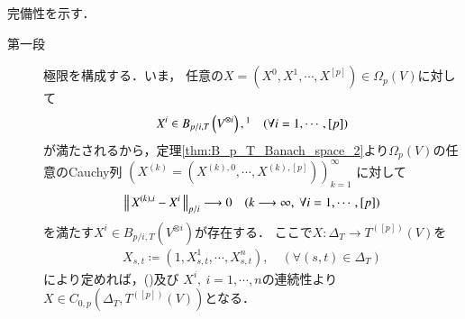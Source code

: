 	\begin{prf}完備性を示す．
		\begin{description}
			\item[第一段] 極限を構成する．いま，
			任意の$X = (X^0,X^1,\cdots,X^{[p]}) \in \Omega_p(V)$に対して
			\begin{align}
				X^i \in B_{p/i,T}\left( V^{\otimes i} \right),\footnotemark
				\quad (\forall i=1,\cdots,[p]) 
			\end{align}
			が満たされるから，定理\ref{thm:B_p_T_Banach_space_2}より$\Omega_p(V)$の任意のCauchy列
			$\left( X^{(k)} = (X^{(k),0},\cdots,X^{(k),[p]}) \right)_{k=1}^{\infty}$
			に対して
			\begin{align}
				\left\|\, X^{(k),i} - X^i\, \right\|_{p/i} \longrightarrow 0
				\quad (k \longrightarrow \infty,\ \forall i=1,\cdots,[p])
				\label{eq:thm_p_rough_path_complete_dist_2}
			\end{align}
			を満たす$X^i \in B_{p/i,T}\left( V^{\otimes i} \right)$が存在する．
			ここで$X:\Delta_T \longrightarrow T^{([p])}(V)$を
			\begin{align}
				X_{s,t} \coloneqq (1,X^1_{s,t},\cdots,X^n_{s,t}),
				\quad (\forall (s,t) \in \Delta_T)
			\end{align}
			により定めれば，()及び
			$X^i,\ i=1,\cdots,n$の連続性より
			$X \in C_{0,p} \left(\Delta_T,T^{([p])}(V) \right)$となる．
		

\end{description}
\end{prf}
